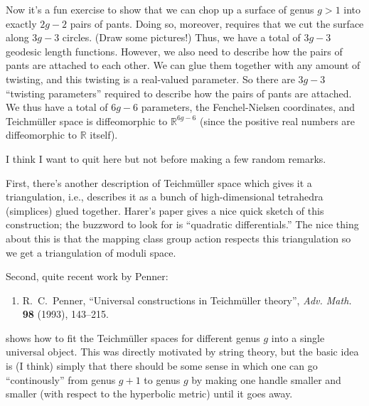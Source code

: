 \documentclass{article}
\def\tightlist{}
\begin{document}
Now it's a fun exercise to show that we can chop up a surface of genus
\(g > 1\) into exactly \(2g-2\) pairs of pants. Doing so, moreover,
requires that we cut the surface along \(3g-3\) circles. (Draw some
pictures!) Thus, we have a total of \(3g-3\) geodesic length functions.
However, we also need to describe how the pairs of pants are attached to
each other. We can glue them together with any amount of twisting, and
this twisting is a real-valued parameter. So there are \(3g-3\)
``twisting parameters'' required to describe how the pairs of pants are
attached. We thus have a total of \(6g-6\) parameters, the
Fenchel-Nielsen coordinates, and Teichm\"uller space is diffeomorphic to
\(\mathbb{R}^{6g-6}\) (since the positive real numbers are diffeomorphic
to \(\mathbb{R}\) itself).

I think I want to quit here but not before making a few random remarks.

First, there's another description of Teichm\"uller space which gives it
a triangulation, i.e., describes it as a bunch of high-dimensional
tetrahedra (simplices) glued together. Harer's paper gives a nice quick
sketch of this construction; the buzzword to look for is ``quadratic
differentials.'' The nice thing about this is that the mapping class
group action respects this triangulation so we get a triangulation of
moduli space.

Second, quite recent work by Penner:

\begin{enumerate}
\def\labelenumi{\arabic{enumi})}
\setcounter{enumi}{7}
\tightlist
\item
  R.\ C.\ Penner, ``Universal constructions in Teichm\"uller theory'', 
  \emph{Adv. Math.} \textbf{98} (1993), 143--215.
\end{enumerate}
\noindent
shows how to fit the Teichm\"uller spaces for different genus \(g\) into
a single universal object. This was directly motivated by string theory,
but the basic idea is (I think) simply that there should be some sense
in which one can go ``continously'' from genus \(g+1\) to genus \(g\) by
making one handle smaller and smaller (with respect to the hyperbolic
metric) until it goes away.
\end{document}
